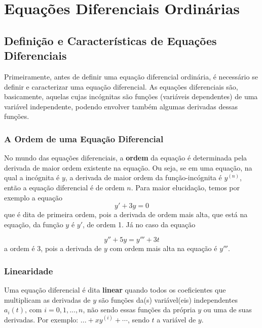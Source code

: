 \chapter{Equações Diferenciais Ordinárias}

    \label{cap:EDOs}

    \section{Definição e Características de Equações Diferenciais}
    
        Primeiramente, antes de definir uma equação diferencial ordinária, é necessário se definir e caracterizar uma equação diferencial. As equações diferenciais são, basicamente, aquelas cujas incógnitas são funções (variáveis dependentes) de uma variável independente, podendo envolver também algumas derivadas dessas funções.

        \subsection{A Ordem de uma Equação Diferencial}

            No mundo das equações diferenciais, a \textbf{ordem} da equação é 
            determinada pela derivada de maior ordem existente na equação. Ou seja, se
            em uma equação, na qual a incógnita é \(y\), a derivada de maior ordem
            da função-incógnita é \(y^{(n)}\), então a equação diferencial é de
            ordem \(n\). Para maior elucidação, temos por exemplo a equação
            \begin{equation*}
                y' + 3y = 0
            \end{equation*}
            que é dita de primeira ordem, pois a derivada de ordem mais alta, que está
            na equação, da função \(y\) é \(y'\), de ordem 1. Já no caso da equação
    
            \begin{equation*}
                y'' + 5y = y''' + 3t
            \end{equation*}
            a ordem é 3, pois a derivada de \(y\) com ordem mais alta na equação é
            \(y'''\).

        \subsection{Linearidade}

            Uma equação diferencial é dita \textbf{linear} quando todos os
            coeficientes que multiplicam as derivadas de \(y\) são funções da(s)
            variável(eis) independentes $a_{i}(t) \text{, com }i = 0, 1, ..., n$,
            não sendo essas funções da própria \(y\) ou uma de suas derivadas. Por exemplo:
            \(... + xy^{(i)} + \cdots\), sendo \(t\) a variável de \(y\). 
            
